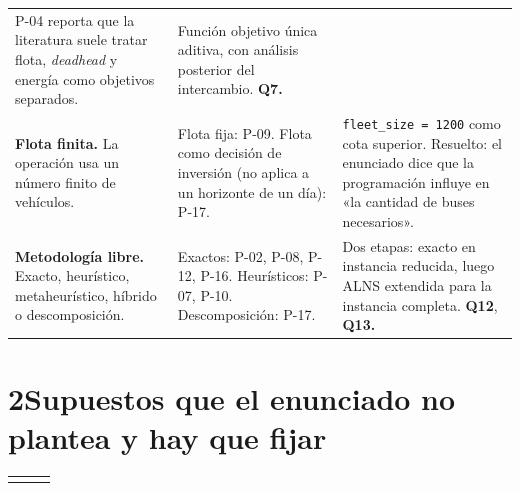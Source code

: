 \documentclass[11pt,a4paper,parskip=half]{scrartcl}
\begin{document}
\begin{landscape}
\begin{longtable}{@{}L{4.4cm}L{8.4cm}L{8.4cm}@{}}
P-04 reporta que la literatura suele tratar flota, \textit{deadhead} y energía como objetivos separados. &
Función objetivo única aditiva, con análisis posterior del intercambio. \textbf{Q7.} \\
\addlinespace
{}
\textbf{Flota finita.} La operación usa un número finito de vehículos. &
Flota fija: P-09. Flota como decisión de inversión (no aplica a un horizonte de un día): P-17. &
\texttt{fleet\_size = 1200} como cota superior. \textcolor{slate}{Resuelto: el enunciado dice que la programación influye en «la cantidad de buses necesarios».} \\
\addlinespace
\textbf{Metodología libre.} Exacto, heurístico, metaheurístico, híbrido o descomposición. &
Exactos: P-02, P-08, P-12, P-16. Heurísticos: P-07, P-10. Descomposición: P-17. &
Dos etapas: exacto en instancia reducida, luego ALNS extendida para la instancia completa. \textbf{Q12}, \textbf{Q13.} \\
\bottomrule
\end{longtable}

\clearpage
\section*{2\quad Supuestos que el enunciado no plantea y hay que fijar}

\begin{longtable}{@{}L{4.4cm}L{8.4cm}L{8.4cm}@{}}
 &  &  \\
\endfirsthead
{}
 &  &  \\
\endhead
\midrule


\end{longtable}
\end{landscape}
\end{document}
